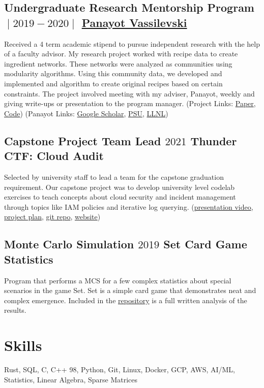 \documentclass{article}
\begin{document}
\subsection{Undergraduate Research Mentorship Program $\;\vert\;2019-2020\;\vert\;$ \href{https://scholar.google.com/citations?user=GhpkHDAAAAAJ&hl=en}{Panayot Vassilevski}}
Received a 4 term academic stipend to pursue independent research with the help of a faculty advisor.
My research project worked with recipe data to create ingredient networks. 
These networks were analyzed as communities using modularity algorithms. Using this community data,
we developed and implemented and algorithm to create original recipes based on certain constraints.
The project involved meeting with my adviser, Panayot, weekly and giving write-ups or presentation to the program manager.
(Project Links: \href{https://raw.githubusercontent.com/aujxn/research/master/paper/Cullinary_Computation_paper.pdf}{Paper}, \href{https://github.com/aujxn/recipe_analysis}{Code})
(Panayot Links: \href{https://scholar.google.com/citations?user=GhpkHDAAAAAJ&hl=en}{Google Scholar}, \href{http://web.pdx.edu/~panayot/}{PSU}, \href{https://people.llnl.gov/vassilevski1}{LLNL})

\subsection{Capstone Project Team Lead $2021$ Thunder CTF: Cloud Audit}
Selected by university staff to lead a team for the capstone graduation requirement. Our
capstone project was to develop university level codelab exercises to teach concepts about cloud security
and incident management through topics like IAM policies and iterative log querying.
(\href{https://www.youtube.com/watch?v=hFRoQ-CNmKI}{presentation video}, \href{https://storage.googleapis.com/website_source/resources/capstone.pdf}{project plan}, \href{https://github.com/NicholasSpringer/thunder-ctf/tree/master/core/levels/defender}{git repo}, \href{https://asokamoto.github.io/CloudAuditCTFs/}{website})

\subsection{Monte Carlo Simulation $2019$ Set Card Game Statistics}
Program that performs a MCS for a few complex statistics about special scenarios in the game Set. Set is a simple card game that demonstrates neat
and complex emergence. Included in the \href{https://github.com/aujxn/set_game_simulator}{repository} is a full written analysis of the results.

\section{Skills}
Rust, SQL, C, C++ 98, Python, Git, Linux, Docker, GCP, AWS, AI/ML, Statistics, Linear Algebra, Sparse Matrices
\end{document}
